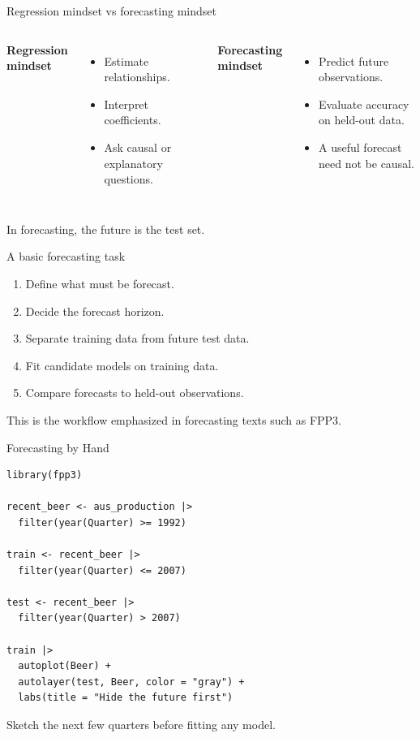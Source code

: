 \documentclass[aspectratio=169,11pt]{beamer}
\begin{document}
\begin{frame}{Regression mindset vs forecasting mindset}
\begin{columns}[T]
\textbf{Regression mindset}
\begin{itemize}
  \item Estimate relationships.
  \item Interpret coefficients.
  \item Ask causal or explanatory questions.
\end{itemize}

\textbf{Forecasting mindset}
\begin{itemize}
  \item Predict future observations.
  \item Evaluate accuracy on held-out data.
  \item A useful forecast need not be causal.
\end{itemize}
\end{columns}

\vspace{0.5cm}
In forecasting, the future is the test set.
\end{frame}

\begin{frame}{A basic forecasting task}
\begin{enumerate}
  \item Define what must be forecast.
  \item Decide the forecast horizon.
  \item Separate training data from future test data.
  \item Fit candidate models on training data.
  \item Compare forecasts to held-out observations.
\end{enumerate}

\vspace{0.4cm}
This is the workflow emphasized in forecasting texts such as FPP3.
\end{frame}

\begin{frame}[fragile]{Forecasting by Hand}
\begin{lstlisting}
library(fpp3)

recent_beer <- aus_production |>
  filter(year(Quarter) >= 1992)

train <- recent_beer |>
  filter(year(Quarter) <= 2007)

test <- recent_beer |>
  filter(year(Quarter) > 2007)

train |>
  autoplot(Beer) +
  autolayer(test, Beer, color = "gray") +
  labs(title = "Hide the future first")
\end{lstlisting}

\vspace{0.2cm}
Sketch the next few quarters before fitting any model.
\end{frame}
\end{document}
